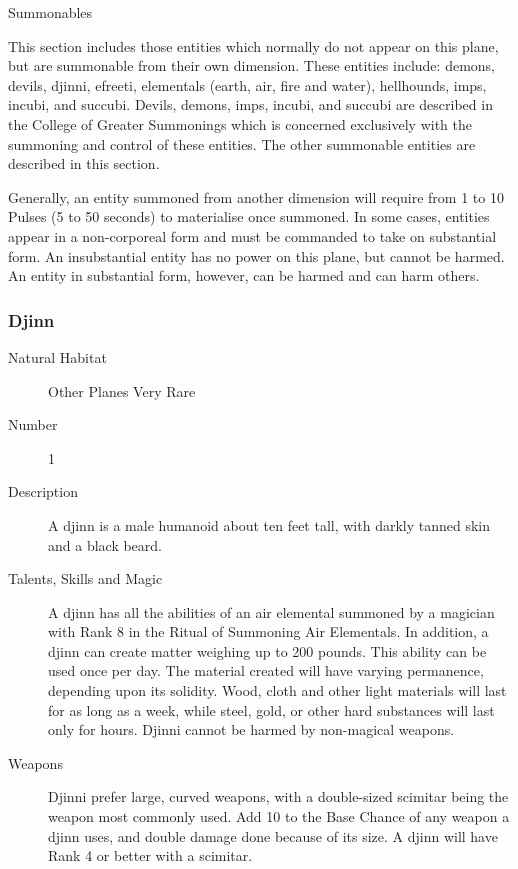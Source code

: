 \begin{mmgroup}{Summonables}

This section includes those entities which normally do not appear on
this plane, but are summonable from their own dimension.  These
entities include: demons, devils, djinni, efreeti, elementals (earth,
air, fire and water), hellhounds, imps, incubi, and succubi.  Devils,
demons, imps, incubi, and succubi are described in the College of
Greater Summonings which is concerned exclusively with the summoning
and control of these entities.  The other summonable entities are
described in this section.

Generally, an entity summoned from another dimension will require from
1 to 10 Pulses (5 to 50 seconds) to materialise once summoned.  In
some cases, entities appear in a non-corporeal form and must be
commanded to take on substantial form.  An insubstantial entity has no
power on this plane, but cannot be harmed. An entity in substantial
form, however, can be harmed and can harm others.


\subsubsection{Djinn}

\begin{description}
\item[Natural Habitat]  Other Planes Very Rare

\item[Number] 1

\item[Description] A djinn is a male humanoid about ten feet tall, with
darkly tanned skin and a black beard.

\item[Talents, Skills and Magic] A djinn has all the abilities of an air elemental summoned
by a magician with Rank 8 in the Ritual of Summoning Air Elementals.
In addition, a djinn can create matter weighing up to 200 pounds.
This ability can be used once per day.  The material created will have
varying permanence, depending upon its solidity. Wood, cloth and other
light materials will last for as long as a week, while steel, gold, or
other hard substances will last only for hours. Djinni cannot be
harmed by non-magical weapons.

\item[Weapons] Djinni prefer large, curved weapons, with a double-sized
scimitar being the weapon most commonly used. Add 10 to the Base
Chance of any weapon a djinn uses, and double damage done because of
its size. A djinn will have Rank 4 or better with a scimitar.


\end{description}
\end{mmgroup}
